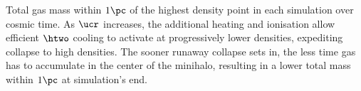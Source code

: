 \label{fig:collapse}
Total gas mass within $1\pc$ of the highest density point in each simulation over cosmic time.
As $\ucr$ increases, the additional heating and ionisation allow efficient $\htwo$ cooling to activate at progressively lower densities, expediting collapse to high densities.  The sooner runaway collapse sets in, the less time gas has to accumulate in the center of the minihalo, resulting in a lower total mass within $1\pc$ at simulation's end.